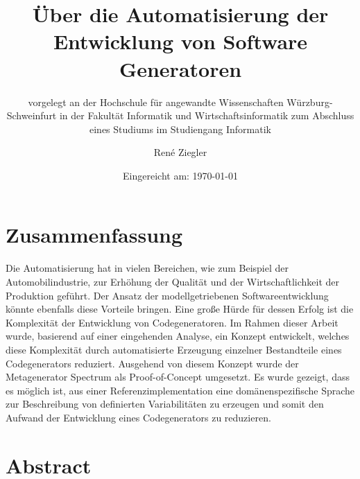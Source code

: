 \documentclass[12pt,oneside,a4paper,parskip]{scrbook}
\def\BaAuthor{René Ziegler}
\def\BaTitle{Über die Automatisierung der Entwicklung von Software Generatoren}
\def\BaSupervisorOne{Prof.\ Dr.\ Peter Braun}
\def\BaSupervisorTwo{M.Sc. Tobias Fertig}
\def\BaDeadline{\today}
\begin{document}


\frontmatter
\titlehead{%
{Hochschule für angewandte Wissenschaften Würzburg-Schweinfurt\\
Fakultät Informatik und Wirtschaftsinformatik}}
\subject{Bachelorarbeit}
\title{\BaTitle\\[15mm]}
\subtitle{\normalsize{vorgelegt an der Hochschule f\"{u}r angewandte Wissenschaften W\"{u}rzburg-Schweinfurt in der Fakult\"{a}t Informatik und Wirtschaftsinformatik zum Abschluss eines Studiums im Studiengang Informatik}}
\author{\BaAuthor}
\date{\normalsize{Eingereicht am: \BaDeadline}}
\publishers{
\normalsize{Erstpr\"{u}fer: \BaSupervisorOne}\\
\normalsize{Zweitpr\"{u}fer: \BaSupervisorTwo}\\
}


\maketitle



\section*{Zusammenfassung}

Die Automatisierung hat in vielen Bereichen, wie zum Beispiel der Automobilindustrie, zur Erhöhung der Qualität und der Wirtschaftlichkeit der Produktion geführt. Der Ansatz der modellgetriebenen Softwareentwicklung könnte ebenfalls diese Vorteile bringen. Eine große Hürde für dessen Erfolg ist die Komplexität der Entwicklung von Codegeneratoren. Im Rahmen dieser Arbeit wurde, basierend auf einer eingehenden Analyse, ein Konzept entwickelt, welches diese Komplexität durch automatisierte Erzeugung einzelner Bestandteile eines Codegenerators reduziert. Ausgehend von diesem Konzept wurde der Metagenerator Spectrum als Proof-of-Concept umgesetzt. Es wurde gezeigt, dass es möglich ist, aus einer Referenzimplementation eine domänenspezifische Sprache zur Beschreibung von definierten Variabilitäten zu erzeugen und somit den Aufwand der Entwicklung eines Codegenerators zu reduzieren.

\section*{Abstract}
\end{document}
